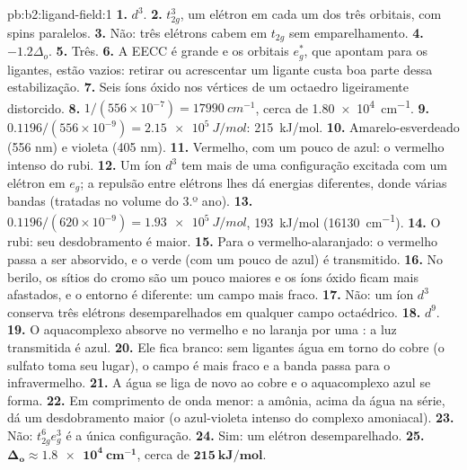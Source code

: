 \begin{solution}{pb:b2:ligand-field:1}
\textbf{1.} $d^3$.
\textbf{2.} $t_{2g}^3$, um elétron em cada um dos três orbitais, com spins paralelos.
\textbf{3.} Não: três elétrons cabem em $t_{2g}$ sem emparelhamento.
\textbf{4.} $-1.2\Delta_o$.
\textbf{5.} Três.
\textbf{6.} A EECC é grande e os orbitais $e_g^*$, que apontam para os ligantes,
estão vazios: retirar ou acrescentar um ligante custa boa parte dessa
estabilização.
\textbf{7.} Seis íons óxido nos vértices de um octaedro ligeiramente distorcido.
\textbf{8.} $1/(556 \times 10^{-7}) = \qty{17990}{cm^{-1}}$, cerca de \qty{1.80e4}{cm^{-1}}.
\textbf{9.} $0.1196/(556 \times 10^{-9}) = \qty{2.15e5}{J/mol}$: \qty{215}{kJ/mol}.
\textbf{10.} Amarelo-esverdeado (556 nm) e violeta (405 nm).
\textbf{11.} Vermelho, com um pouco de azul: o vermelho intenso do rubi.
\textbf{12.} Um íon $d^3$ tem mais de uma configuração excitada com um elétron em
$e_g$; a repulsão entre elétrons lhes dá energias diferentes, donde várias
bandas (tratadas no volume do 3.º ano).
\textbf{13.} $0.1196/(620 \times 10^{-9}) = \qty{1.93e5}{J/mol}$, \qty{193}{kJ/mol}
(\qty{16130}{cm^{-1}}).
\textbf{14.} O rubi: seu desdobramento é maior.
\textbf{15.} Para o vermelho-alaranjado: o vermelho passa a ser absorvido, e o
verde (com um pouco de azul) é transmitido.
\textbf{16.} No berilo, os sítios do cromo são um pouco maiores e os íons óxido
ficam mais afastados, e o entorno é diferente: um campo mais fraco.
\textbf{17.} Não: um íon $d^3$ conserva três elétrons desemparelhados em
qualquer campo octaédrico.
\textbf{18.} $d^9$.
\textbf{19.} O aquacomplexo absorve no vermelho e no laranja por uma : a luz transmitida é azul.
\textbf{20.} Ele fica branco: sem ligantes água em torno do cobre (o sulfato
toma seu lugar), o campo é mais fraco e a banda passa para o infravermelho.
\textbf{21.} A água se liga de novo ao cobre e o aquacomplexo azul se forma.
\textbf{22.} Em comprimento de onda menor: a amônia, acima da água na série, dá um
desdobramento maior (o azul-violeta intenso do complexo amoniacal).
\textbf{23.} Não: $t_{2g}^6e_g^3$ é a única configuração.
\textbf{24.} Sim: um elétron desemparelhado.
\textbf{25.} $\boldsymbol{\Delta_o \approx \qty{1.8e4}{cm^{-1}}}$, cerca de
$\boldsymbol{\qty{215}{kJ/mol}}$.
\end{solution}
